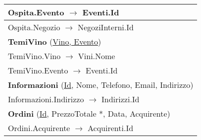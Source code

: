 \begin{center}
\begin{minipage}[t]{7.5cm}
{\begin{tabular}{P{7.5cm}}
				\midrule
				Ospita.Evento $\to$ Eventi.Id                                                                                        \\
				\midrule
				Ospita.Negozio $\to$ NegoziInterni.Id                                                                                \\
				\midrule
				 \textbf{TemiVino} (\underline{Vino, Evento})                                        \\
				\midrule
				TemiVino.Vino $\to$ Vini.Nome                                                                                        \\
				\midrule
				TemiVino.Evento $\to$ Eventi.Id                                                                                      \\
				\midrule
				 \textbf{Informazioni} (\underline{Id}, Nome, Telefono, Email, Indirizzo)            \\
				\midrule
				Informazioni.Indirizzo $\to$ Indirizzi.Id                                                                            \\
				\midrule
				 \textbf{Ordini} (\underline{Id}, PrezzoTotale *, Data, Acquirente)                  \\
				\midrule
				Ordini.Acquirente $\to$ Acquirenti.Id                                                                                \\
				\midrule
			\end{tabular}
		}
	\end{minipage}
	\hspace{5mm}
	\begin{minipage}[t]{7.5cm}
\end{minipage}
\end{center}
